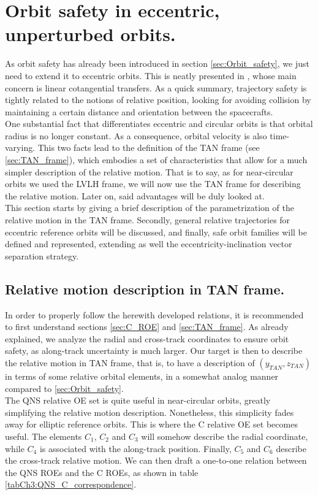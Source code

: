 \section{Orbit safety in eccentric, unperturbed orbits.}
%
\indent As orbit safety has already been introduced in section \ref{sec:Orbit_safety}, we just need to extend it to eccentric orbits. This is neatly presented in \cite{Peters_Noomen}, whose main concern is linear cotangential transfers. As a quick summary, trajectory safety is tightly related to the notions of relative position, looking for avoiding collision by maintaining a certain distance and orientation between the spacecrafts.\\
%
\indent One substantial fact that differentiates eccentric and circular orbits is that orbital radius is no longer constant. As a consequence, orbital velocity is also time-varying. This two facts lead to the definition of the TAN frame (see \ref{sec:TAN_frame}), which embodies a set of characteristics that allow for a much simpler description of the relative motion. That is to say, as for near-circular orbits we used the LVLH frame, we will now use the TAN frame for describing the relative motion. Later on, said advantages will be duly looked at. \\
%
\indent This section starts by giving a brief description of the parametrization of the relative motion in the TAN frame. Secondly, general relative trajectories for eccentric reference orbits will be discussed, and finally, safe orbit families will be defined and represented, extending as well the eccentricity-inclination vector separation strategy.
%
	\subsection{Relative motion description in TAN frame.}
	\indent In order to properly follow the herewith developed relations, it is recommended to first understand sections \ref{sec:C_ROE} and \ref{sec:TAN_frame}. As already explained, we analyze the radial and cross-track coordinates to ensure orbit safety, as along-track uncertainty is much larger. Our target is then to describe the relative motion in TAN frame, that is, to have a description of $(y_{TAN}, z_{TAN})$ in terms of some relative orbital elements, in a somewhat analog manner compared to \ref{sec:Orbit_safety}.\\
	\indent The QNS relative OE set is quite useful in near-circular orbits, greatly simplifying the relative motion description. Nonetheless, this simplicity fades away for elliptic reference orbits. This is where the C relative OE set becomes useful. The elements $C_1$, $C_2$ and $C_3$ will somehow describe the radial coordinate, while $C_4$ is associated with the along-track position. Finally, $C_5$ and $C_6$ describe the cross-track relative motion. We can then draft a one-to-one relation between the QNS ROEs and the C ROEs, as shown in table \ref{tabCh3:QNS_C_correspondence}.\\
	
